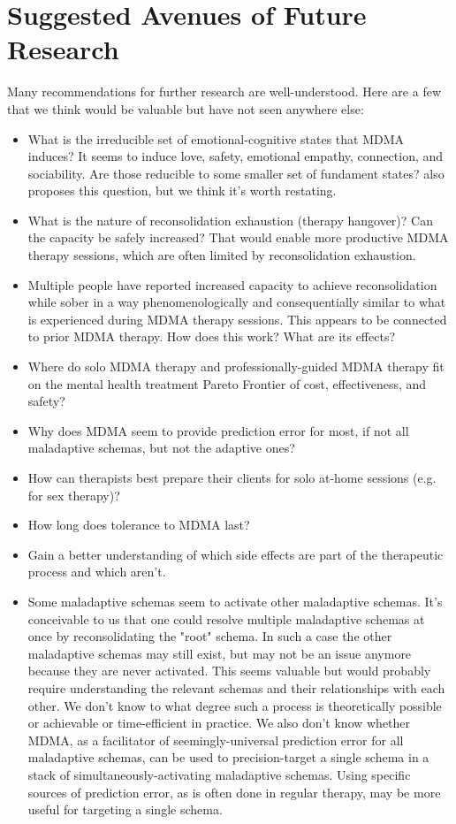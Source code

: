 \documentclass[12pt,letterpaper]{book}
\begin{document}
\chapter{Suggested Avenues of Future Research}
Many recommendations for further research are well-understood. Here are a few that we think would be valuable but have not seen anywhere else:
\begin{itemize}
    \item What is the irreducible set of emotional-cognitive states that MDMA induces? It seems to induce love, safety, emotional empathy, connection, and sociability. Are those reducible to some smaller set of fundament states? \textcite{regan2021Connection} also proposes this question, but we think it's worth restating.
    \item What is the nature of reconsolidation exhaustion (therapy hangover)? Can the capacity be safely increased? That would enable more productive MDMA therapy sessions, which are often limited by reconsolidation exhaustion.
    \item Multiple people have reported increased capacity to achieve reconsolidation while sober in a way phenomenologically and consequentially similar to what is experienced during MDMA therapy sessions. This appears to be connected to prior MDMA therapy. How does this work? What are its effects?
    \item Where do solo MDMA therapy and professionally-guided MDMA therapy fit on the mental health treatment Pareto Frontier of cost, effectiveness, and safety?
    \item Why does MDMA seem to provide prediction error for most, if not all maladaptive schemas, but not the adaptive ones?
    \item How can therapists best prepare their clients for solo at-home sessions (e.g. for sex therapy)?
    \item How long does tolerance to MDMA last?
    \item Gain a better understanding of which side effects are part of the therapeutic process and which aren't.
    \item Some maladaptive schemas seem to activate other maladaptive schemas. It's conceivable to us that one could resolve multiple maladaptive schemas at once by reconsolidating the "root" schema. In such a case the other maladaptive schemas may still exist, but may not be an issue anymore because they are never activated. This seems valuable but would probably require understanding the relevant schemas and their relationships with each other. We don't know to what degree such a process is theoretically possible or achievable or time-efficient in practice. We also don't know whether MDMA, as a facilitator of seemingly-universal prediction error for all maladaptive schemas, can be used to precision-target a single schema in a stack of simultaneously-activating maladaptive schemas. Using specific sources of prediction error, as is often done in regular therapy, may be more useful for targeting a single schema.

\end{itemize}
\end{document}
